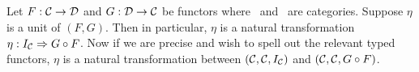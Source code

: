 Let $F:\mbox{$\cal C$}\to\mbox{$\cal D$}$ and $G:\mbox{$\cal D$}\to\mbox{$\cal C$}$ be functors where \Cat\ and \Dat\ 
are categories. Suppose $\eta$ is a unit of $(F,G)$. Then in particular,
$\eta$ is a natural transformation $\eta:I_{\cal C}\Rightarrow G\circ F$.
Now if we are precise and wish to spell out the relevant typed functors,
$\eta$ is a natural transformation between $(\mbox{$\cal C$},\mbox{$\cal C$},I_{\cal C})$ and
$(\mbox{$\cal C$},\mbox{$\cal C$},G\circ F)$.
